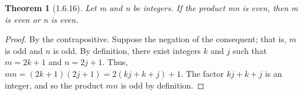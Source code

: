 \documentclass[a4paper, 12pt]{article}
\theoremstyle{plain}
\newtheorem*{theorem*}{Theorem}
\begin{document}
	
	\begin{theorem*}[1.6.16]
		Let m and n be integers. If the product mn is even, then m is even or n is even.
	\end{theorem*}
	
	\begin{proof}
		By the contrapositive. Suppose the negation of the consequent; that is, $m$ is odd and $n$ is odd. By definition, there exist integers $k$ and $j$ such that $m = 2k + 1$ and $n = 2j + 1$. Thus, $mn = (2k + 1)(2j + 1) = 2(kj + k + j) + 1$. The factor $kj + k + j$ is an integer, and so the product $mn$ is odd by definition.
	\end{proof}
\end{document}
